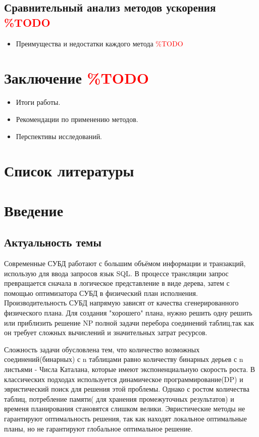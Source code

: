 \documentclass[12pt]{article}
\begin{document}
\begin{flushleft}
\subsection*{Сравнительный анализ методов ускорения \textcolor{red}{\%TODO}}
\begin{itemize}
    \item Преимущества и недостатки каждого метода \textcolor{red}{\%TODO}
\end{itemize}

\section*{Заключение \textcolor{red}{\%TODO}} 
\begin{itemize}
    \item Итоги работы.
    \item Рекомендации по применению методов.
    \item Перспективы исследований.
\end{itemize}

\section*{Список литературы}
\newpage
\centering    \section*{Введение}
\centering    \subsection*{Актуальность темы}
\raggedright

Современные СУБД работают с большим объёмом информации и транзакций, использую для ввода запросов язык SQL. 
В процессе трансляции запрос превращается сначала в логическое представление в виде дерева, 
затем с помощью оптимизатора СУБД в физический план исполнения. Производительность СУБД напрямую зависят от качества
сгенерированного физического плана. Для создания "хорошего" плана, нужно решить одну решить или приблизить решение
NP полной задачи перебора соединений таблиц,так как он требует сложных вычислений и значительных затрат ресурсов.

Сложность задачи обусловлена тем, что количество возможных соединений(бинарных) с n таблицами
равно количеству бинарных дерьев с n листьями - Числа Каталана, которые
имеют экспоненциальную скорость роста.
В классических подходах используется динамическое программирование(DP)
и эвристический поиск для решения этой проблемы. Однако с ростом количества таблиц,
потребление памяти( для хранения промежуточных результатов) и временя планирования становятся
слишком велики. Эвристические методы не гарантируют оптимальность решения, так как
находят локальное оптимальные планы, но не гарантируют глобальное оптимальное решение.


\end{flushleft}
\end{document}
